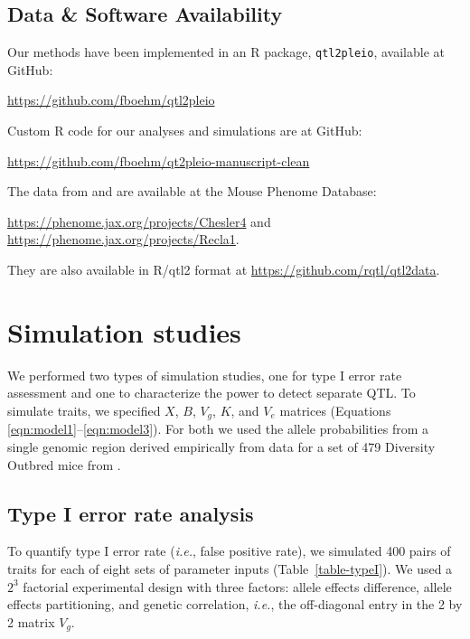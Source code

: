 \documentclass[oneside]{book}\usepackage[]{graphicx}\usepackage[]{color}
\begin{document}
\subsection{Data \& Software Availability}

Our methods have been implemented in an R package, \texttt{qtl2pleio},
available at GitHub:

\href{https://github.com/fboehm/qtl2pleio}{https://github.com/fboehm/qtl2pleio}

\noindent Custom R code for our analyses and simulations are at GitHub:

\href{https://github.com/fboehm/qtl2pleio-manuscript-clean}{https://github.com/fboehm/qt2pleio-manuscript-clean}

\noindent The data from \citet{recla2014precise} and
\citet{logan2013high} are available at the Mouse Phenome Database:

\href{https://phenome.jax.org/projects/Chesler4}{https://phenome.jax.org/projects/Chesler4} and \href{https://phenome.jax.org/projects/Recla1}{https://phenome.jax.org/projects/Recla1}.

\noindent They are also available in R/qtl2 format at
\href{https://github.com/rqtl/qtl2data}{https://github.com/rqtl/qtl2data}.




\section{Simulation studies}

We performed two types of simulation studies, one for type I error
rate assessment and one to characterize the power to detect separate
QTL. To simulate traits, we specified $X$, $B$, $V_g$, $K$, and $V_e$
matrices (Equations \ref{eqn:model1}--\ref{eqn:model3}). For both we
used the allele probabilities from a single genomic region derived
empirically from data for a set of 479 Diversity Outbred mice from
\citet{keller2018genetic}.

\subsection{Type I error rate analysis}

To quantify type I error rate ({\em i.e.}, false positive rate), we
simulated 400 pairs of traits for each of eight sets of parameter
inputs (Table~\ref{table-typeI}). We used a $2^3$ factorial
experimental design with three factors: allele effects difference,
allele effects partitioning, and genetic correlation, \textit{i.e.},
the off-diagonal entry in the 2 by 2 matrix $V_g$.
\end{document}
